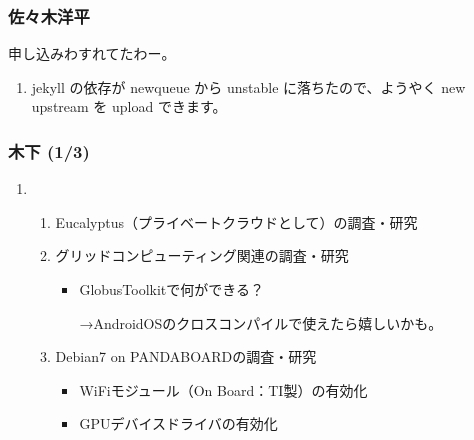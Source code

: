 \documentclass[cjk,dvipdfmx,10pt,compress,%
hyperref={bookmarks=true,bookmarksnumbered=true,bookmarksopen=false,%
colorlinks=false,%
pdftitle={第 85 回 関西 Debian 勉強会},%
pdfauthor={倉敷・のがた・佐々木・かわだ・八津尾},%
pdfsubject={資料},%
}]{beamer}
\begin{document}
\begin{frame}
  \frametitle{ 佐々木洋平 }
  申し込みわすれてたわー。

  \begin{enumerate}
  \item jekyll の依存が newqueue から unstable に落ちたので、ようやく
    new upstream を upload できます。
  \end{enumerate}

\end{frame}

\begin{frame}
  \frametitle{ 木下 (1/3)}
  \begin{enumerate}
  \item
    \begin{enumerate}
    \item Eucalyptus（プライベートクラウドとして）の調査・研究
    \item グリッドコンピューティング関連の調査・研究
      \begin{itemize}
      \item GlobusToolkitで何ができる？

        →AndroidOSのクロスコンパイルで使えたら嬉しいかも。
      \end{itemize}
    \item Debian7 on PANDABOARDの調査・研究
      \begin{itemize}
      \item WiFiモジュール（On Board：TI製）の有効化
      \item GPUデバイスドライバの有効化
      \end{itemize}
    \end{enumerate}
  \end{enumerate}
\end{frame}
\end{document}
